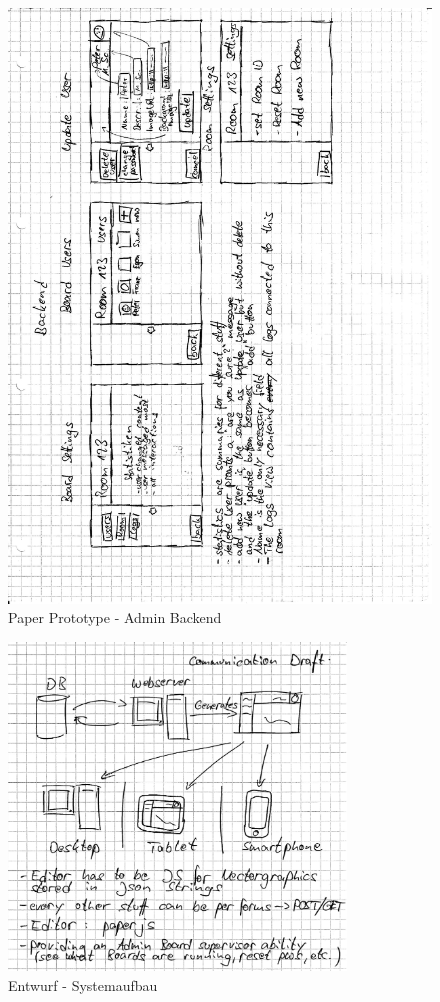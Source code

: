 \newpage
\begin{figure}[h!]
  \centering
    \includegraphics[width=1\textwidth]{./img/paperPrototypeBackend2.png}
  \caption{Paper Prototype - Admin Backend}
  \label{img:paperPrototypeBackend2}
\end{figure}
\newpage
\begin{figure}[h!]
  \centering
    \includegraphics[width=0.8\textwidth]{./img/draftCommunication.png}
  \caption{Entwurf - Systemaufbau}
  \label{img:anhangLocations}
\end{figure}
